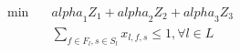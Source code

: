 \begin{align}
  \min\quad & \mathit{alpha}_{1} Z_{1} + \mathit{alpha}_{2} Z_{2} + \mathit{alpha}_{3} Z_{3} \tag{eq\_0001} \\
  & \sum_{f \in F_{l}, s \in S_{l}} x_{l , f , s} \leq 1 , \forall l \in L \tag{eq\_0005} \\
\end{align}
